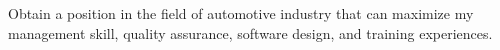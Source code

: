 Obtain a position in the field of automotive industry
that can maximize my management skill,
     quality assurance,
     software design,
     and training experiences.
